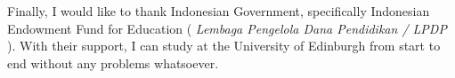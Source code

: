 \documentclass[msc,logo]{infthesis}  %
\begin{document}
\begin{preliminary}
\begin{acknowledgements}
\vspace{1cm}

Finally, I would like to thank Indonesian Government, specifically Indonesian Endowment Fund for Education ( \textit{Lembaga  Pengelola Dana Pendidikan / LPDP} ). With their support, I can study at the University of Edinburgh from start to end without any problems whatsoever. 
\end{acknowledgements}

\standarddeclaration


\tableofcontents

\listoffigures
\lstlistoflistings


\end{preliminary}













%








\appendix




\end{document}
